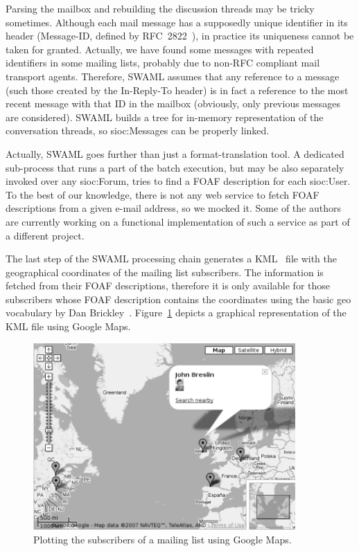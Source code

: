 \documentclass{llncs}
\begin{document}

Parsing the mailbox and rebuilding the discussion threads may be
tricky sometimes. Although each mail message has a supposedly unique
identifier in its header (\textsf{Message-ID}, defined by
RFC~2822~\cite{RFC2822}), in practice its uniqueness cannot be
taken for granted. Actually, we have found some
messages with repeated identifiers in some mailing lists,
probably due to non-RFC compliant mail transport agents.
Therefore, SWAML assumes that any reference to a message
(such those created by the \textsf{In-Reply-To} header)
is in fact a reference to the most recent message with that ID
in the mailbox (obviously, only previous messages are
considered). SWAML builds a tree for in-memory representation
of the conversation threads, so \textsf{sioc:Message}s can be
properly linked.

Actually, SWAML goes further than just a format-translation
tool. A dedicated sub-process that runs a part of the batch
execution, but may be also separately invoked over any
\textsf{sioc:Forum}, tries to find a FOAF description for
each \textsf{sioc:User}. To the best of our knowledge, there is not
any web service to fetch FOAF descriptions from a given e-mail
address, so we mocked it. Some of the authors are currently working
on a functional implementation of such a service as part of a
different project.

The last step of the SWAML processing chain generates a
KML~\cite{Ricket2006} file with the geographical coordinates of
the mailing list subscribers. The information is fetched from their
FOAF descriptions, therefore it is only available for those
subscribers whose FOAF description contains the coordinates
using the basic \textsf{geo} vocabulary by Dan
Brickley~\cite{Brickley2006}.
Figure~\ref{fig:googlemaps} depicts a graphical representation
of the KML file using Google Maps.

\begin{figure}[ht]
 \centering
 \includegraphics[bb=0 0 400 285,width=10cm]{images/googlemaps.png}
 \caption{\label{fig:googlemaps}Plotting the subscribers of a mailing list using Google Maps.}
\end{figure}
\end{document}
